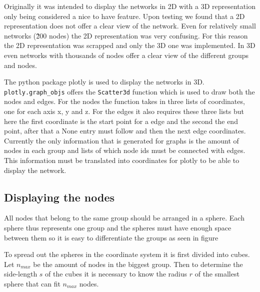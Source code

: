 Originally it was intended to display the networks in 2D with a 3D representation only being considered a nice to have feature. Upon testing we found that a 2D representation does not offer a clear view of the network. Even for relatively small networks (\~200 nodes) the 2D representation was very confusing. For this reason the 2D representation was scrapped and only the 3D one was implemented. In 3D even networks with thousands of nodes offer a clear view of the different groups and nodes.

\newline
The python package plotly \cite{plotly} is used to display the networks in 3D. \texttt{plotly.graph\_objs} offers the \texttt{Scatter3d} function which is used to draw both the nodes and edges. For the nodes the function takes in three lists of coordinates, one for each axis x, y and z. For the edges it also requires these three lists but here the first coordinate is the start point for a edge and the second the end point, after that a None entry must follow and then the next edge coordinates. Currently the only information that is generated for graphs is the amount of nodes in each group and lists of which node ids must be connected with edges. This information must be translated into coordinates for plotly to be able to display the network.

\subsection{Displaying the nodes}
\label{sub:displayNodes}
All nodes that belong to the same group should be arranged in a sphere. Each sphere thus represents one group and the spheres must have enough space between them so it is easy to differentiate the groups as seen in figure %

To spread out the spheres in the coordinate system it is first divided into cubes. Let $n_{max}$ be the amount of nodes in the biggest group. Then to determine the side-length $s$ of the cubes it is necessary to know the radius $r$ of the smallest sphere that can fit $n_{max}$ nodes.

